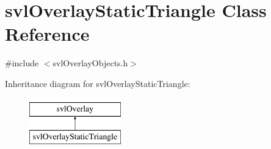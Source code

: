 \hypertarget{classsvl_overlay_static_triangle}{}\section{svl\+Overlay\+Static\+Triangle Class Reference}
\label{classsvl_overlay_static_triangle}


{\ttfamily \#include $<$svl\+Overlay\+Objects.\+h$>$}

Inheritance diagram for svl\+Overlay\+Static\+Triangle\+:\begin{figure}[H]
\begin{center}
\leavevmode
\includegraphics[height=2.000000cm]{d9/dbd/classsvl_overlay_static_triangle}
\end{center}
\end{figure}
